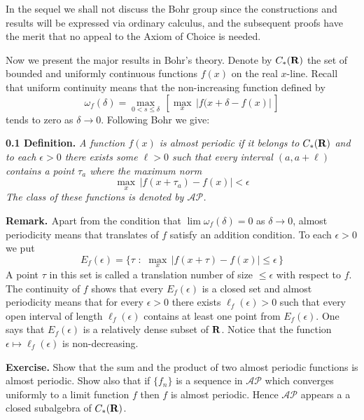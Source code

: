 \documentclass{amsart}
\def\uuu{_}
\def\vvv{-}
\begin{document}
{\medskip

\noindent
In the sequel we shall not discuss the Bohr group  since
the constructions and results will be  expressed via ordinary calculus,
and
the subsequent proofs    have the merit that 
no appeal  to the Axiom of Choice is needed.



\medskip

\noindent
Now we present the major results in Bohr's theory.
Denote by
$C\uuu *({\bf{R}})$ the set of bounded and uniformly continuous functions
$f(x)$ on the real $x$\vvv line. Recall that
uniform continuity means that the non\vvv increasing function
defined by
\[
\omega\uuu f(\delta)= \max\uuu {0<s\leq \delta}\,[
\max\uuu x\,|f(x+\delta\vvv f(x)|\,]
\] 
tends to zero as $\delta\to 0$.
Following Bohr we  give:

\medskip





\noindent
{\bf{0.1 Definition.}} \emph{A function $f(x)$ is almost periodic if 
it belongs to $C\uuu *({\bf{R}})$
and to each $\epsilon>0$ there exists some $\ell >0$
such that
every interval $(a,a+\ell)$ contains a point $\tau\uuu a$ where
the maximum norm}
\[
\max\uuu x\, |f(x+\tau\uuu a)\vvv f(x)|<\epsilon
\]
\emph{The class of these functions is denoted by $\mathcal{AP}$.}
\bigskip


\noindent
{\bf{Remark. }} Apart from the condition that $\lim \omega\uuu f(\delta)=0$
as $\delta\to 0$, almost periodicity means that
translates of $f$ satisfy an addition condition.
To each $\epsilon>0$ we put
\[ 
E\uuu f(\epsilon)=
\{\tau\,\,\colon\,\,
\max\uuu x\, |f(x+\tau)\vvv f(x)|\leq \epsilon\,\}
\]
A point $\tau$ in this set is called  a translation number of size $\leq \epsilon$ with
respect to $f$.
The continuity of $f$ shows that
every  $E\uuu f(\epsilon)$ is a closed set and 
almost periodicity means that
for every $\epsilon>0$ there exists  $\ell\uuu f(\epsilon)>0$
such that
every open interval of length
$\ell\uuu f(\epsilon)$ contains at least one point from
$E\uuu f(\epsilon)$. One  says that
$E\uuu f(\epsilon)$ is a relatively dense subset of
${\bf{R}}$.
Notice that the function $\epsilon\mapsto \ell\uuu f(\epsilon)$ is
non\vvv decreasing.


\medskip

\noindent
{\bf{Exercise.}}
Show that the sum and the product of two almost periodic functions
is almost periodic.
Show also that if $\{f\uuu n\}$ is a sequence in $\mathcal{AP}$
which converges uniformly to a limit function $f$
then $f$ is almost periodic.
Hence $\mathcal {AP}$ appears a a closed subalgebra of
$C\uuu *({\bf{R}})$.
\medskip


}
\end{document}
